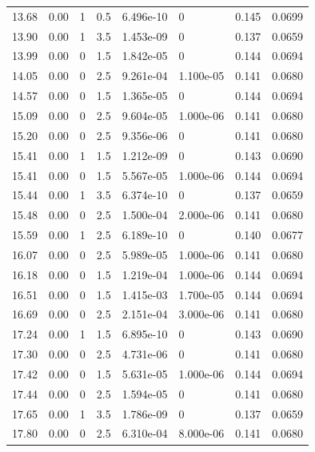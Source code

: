 \documentclass[preview]{standalone}
\begin{document}
{{{\begin{tabular}{L{1.2cm}C{1.2cm} C{0.3cm}C{0.5cm} C{1.4cm}C{1.4cm} C{1.4cm}C{1.4cm}}
  13.68  &  0.00  & 1     & 0.5 &  6.496e-10  & 0  & 0.145 &  0.0699   \\ 
  13.90  &  0.00  & 1     & 3.5 &  1.453e-09  & 0  & 0.137 &  0.0659   \\ 
  13.99  &  0.00  & 0     & 1.5 &  1.842e-05  & 0  & 0.144 &  0.0694   \\ 
  14.05  &  0.00  & 0     & 2.5 &  9.261e-04  & 1.100e-05  & 0.141 &  0.0680   \\ 
  14.57  &  0.00  & 0     & 1.5 &  1.365e-05  & 0  & 0.144 &  0.0694   \\ 
  15.09  &  0.00  & 0     & 2.5 &  9.604e-05  & 1.000e-06  & 0.141 &  0.0680   \\ 
  15.20  &  0.00  & 0     & 2.5 &  9.356e-06  & 0  & 0.141 &  0.0680   \\ 
  15.41  &  0.00  & 1     & 1.5 &  1.212e-09  & 0  & 0.143 &  0.0690   \\ 
  15.41  &  0.00  & 0     & 1.5 &  5.567e-05  & 1.000e-06  & 0.144 &  0.0694   \\ 
  15.44  &  0.00  & 1     & 3.5 &  6.374e-10  & 0  & 0.137 &  0.0659   \\ 
  15.48  &  0.00  & 0     & 2.5 &  1.500e-04  & 2.000e-06  & 0.141 &  0.0680   \\ 
  15.59  &  0.00  & 1     & 2.5 &  6.189e-10  & 0  & 0.140 &  0.0677   \\ 
  16.07  &  0.00  & 0     & 2.5 &  5.989e-05  & 1.000e-06  & 0.141 &  0.0680   \\ 
  16.18  &  0.00  & 0     & 1.5 &  1.219e-04  & 1.000e-06  & 0.144 &  0.0694   \\ 
  16.51  &  0.00  & 0     & 1.5 &  1.415e-03  & 1.700e-05  & 0.144 &  0.0694   \\ 
  16.69  &  0.00  & 0     & 2.5 &  2.151e-04  & 3.000e-06  & 0.141 &  0.0680   \\ 
  17.24  &  0.00  & 1     & 1.5 &  6.895e-10  & 0  & 0.143 &  0.0690   \\ 
  17.30  &  0.00  & 0     & 2.5 &  4.731e-06  & 0  & 0.141 &  0.0680   \\ 
  17.42  &  0.00  & 0     & 1.5 &  5.631e-05  & 1.000e-06  & 0.144 &  0.0694   \\ 
  17.44  &  0.00  & 0     & 2.5 &  1.594e-05  & 0  & 0.141 &  0.0680   \\ 
  17.65  &  0.00  & 1     & 3.5 &  1.786e-09  & 0  & 0.137 &  0.0659   \\ 
  17.80  &  0.00  & 0     & 2.5 &  6.310e-04  & 8.000e-06  & 0.141 &  0.0680   \\ 

\end{tabular}}}}
\end{document}
